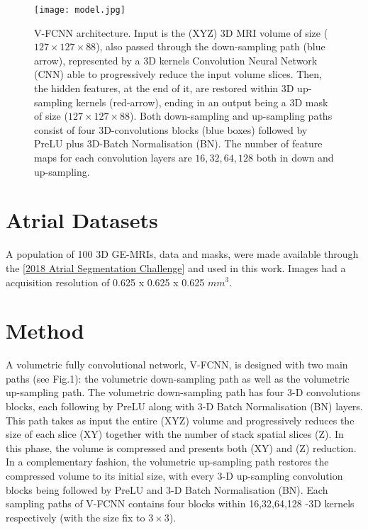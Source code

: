 \documentclass{llncs}
\begin{document}
\begin{figure*}[ht]
\centering
 \texttt{[image: model.jpg]}
   \caption{V-FCNN architecture. Input is the (XYZ) 3D MRI volume of size ($127\times127\times 88$), also passed through the down-sampling path (blue arrow),
represented by a 3D kernels Convolution Neural Network (CNN) able to progressively reduce the input volume slices.
Then, the hidden features, at the end of it, are restored within 3D up-sampling kernels (red-arrow), ending in an output being a 3D mask of size ($127\times127\times 88$). Both down-sampling and up-sampling paths consist of four 3D-convolutions blocks (blue boxes) followed by PreLU plus 3D-Batch Normalisation (BN). The number of feature maps for each convolution layers are $16,32,64,128$ both in down and up-sampling.}
\label{fig:fig1}
\end{figure*}


\section{Atrial Datasets}

A population of 100 3D GE-MRIs, data and masks, were made available through the [\href{http://atriaseg2018.cardiacatlas.org/}{2018 Atrial Segmentation Challenge}] and used in this work. Images had a acquisition resolution of 0.625 x 0.625 x 0.625 $mm^3$.

\section{Method}

A volumetric fully convolutional network, V-FCNN, is designed with two main paths (see Fig.1): the volumetric down-sampling path as well as the volumetric up-sampling path. The volumetric down-sampling path has four 3-D convolutions blocks, each following by PreLU along with 3-D Batch Normalisation (BN) layers. This path takes as input the entire (XYZ) volume and progressively reduces the size of each slice (XY) together with the number of stack spatial slices (Z). In this phase, the volume is compressed and presents both (XY) and (Z) reduction.
In a complementary fashion, the volumetric up-sampling path restores the compressed volume to its initial size, with every 3-D up-sampling convolution blocks being followed by PreLU and 3-D Batch Normalisation (BN).
Each sampling paths of V-FCNN contains four blocks within 16,32,64,128 -3D kernels respectively (with the size fix to $3\times3$).
\end{document}
